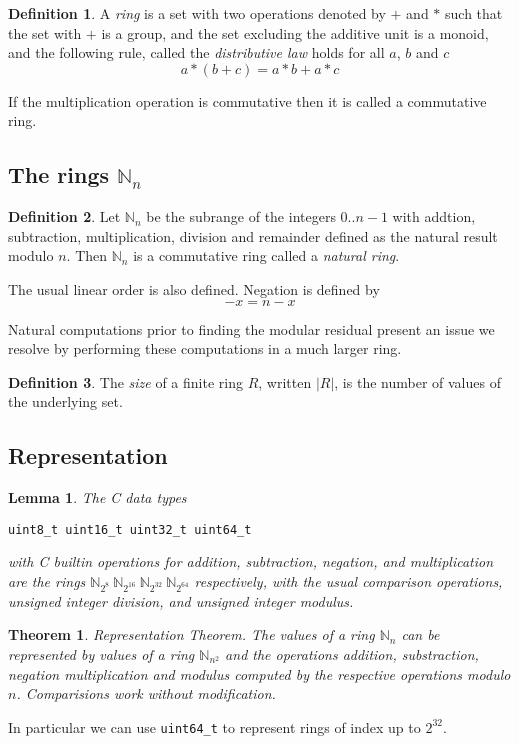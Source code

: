 \documentclass[oneside]{book}
\theoremstyle{plain}
\theoremstyle{definition}
\newtheorem{definition}{Definition}
\theoremstyle{plain}
\newtheorem{lemma}{Lemma}
\newtheorem{theorem}{Theorem}
\begin{document}
\begin{definition}
A {\em ring} is a set with two operations denoted by $+$ and $*$ such
that the set with $+$ is a group, and the set excluding the additive
unit is a monoid, and the following rule, called the
{\em distributive law} holds for all $a$, $b$ and $c$
$$a * (b + c)  = a * b + a * c$$

If the multiplication operation is commutative then it is called
a commutative ring.
\end{definition}

\subsection{The rings $\mathbb{N}_n$}
\begin{definition}
Let $\mathbb{N}_n$ be the subrange of the integers $0..n-1$ with 
addtion, subtraction, 
multiplication, division and remainder defined as the natural result modulo $n$.
Then $\mathbb{N}_n$ is a commutative ring called a {\em natural ring}.
\end{definition}

The usual linear order is also defined.  Negation is defined by
$$-x = n - x$$

Natural computations prior to finding the modular residual present an issue
we resolve by performing these computations in a much larger ring.

\begin{definition}
The {\em size} of a finite ring $R$, written $|R|$, is the number of values of the underlying set.
\end{definition}
\subsection{Representation}
\begin{lemma} The C data types
\begin{verbatim}
uint8_t uint16_t uint32_t uint64_t
\end{verbatim}
with C builtin operations for addition, subtraction, negation, and multiplication
are the rings
\(\mathbb{N}_{2^8}\ \mathbb{N}_{2^{16}}\ \mathbb{N}_{2^{32}}\ \mathbb{N}_{2^{64}} \)
respectively, with the usual comparison operations, unsigned integer division,
and unsigned integer modulus.
\end{lemma}

\begin{theorem}
{\em Representation Theorem}. The values of a ring $\mathbb{N}_n$ can be represented
by values of a ring $\mathbb{N}_{n^2}$ and the operations addition, substraction, negation
multiplication and modulus computed by the respective operations modulo $n$. Comparisions
work without modification.
\end{theorem}
In particular we can use \verb$uint64_t$ to represent rings of index up to 
$2^{32}$.
\end{document}
